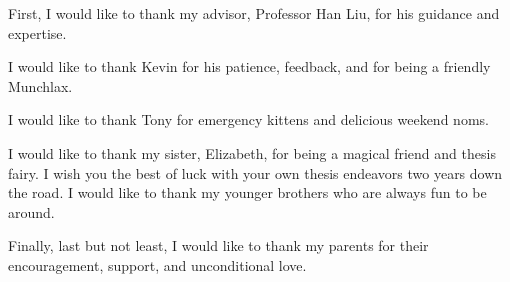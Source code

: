 First, I would like to thank my advisor, Professor Han Liu, for his 
guidance and expertise.

I would like to thank Kevin for his patience, feedback, and for being a 
friendly Munchlax. 

I would like to thank Tony for emergency kittens and delicious weekend noms.

I would like to thank my sister, Elizabeth, for being a magical friend 
and thesis fairy. I wish you the best of luck with your own thesis endeavors 
two years down the road. 
I would like to thank my younger brothers who are always fun to be around.

Finally, last but not least, I would like to thank my parents for their 
encouragement, support, and unconditional love. 